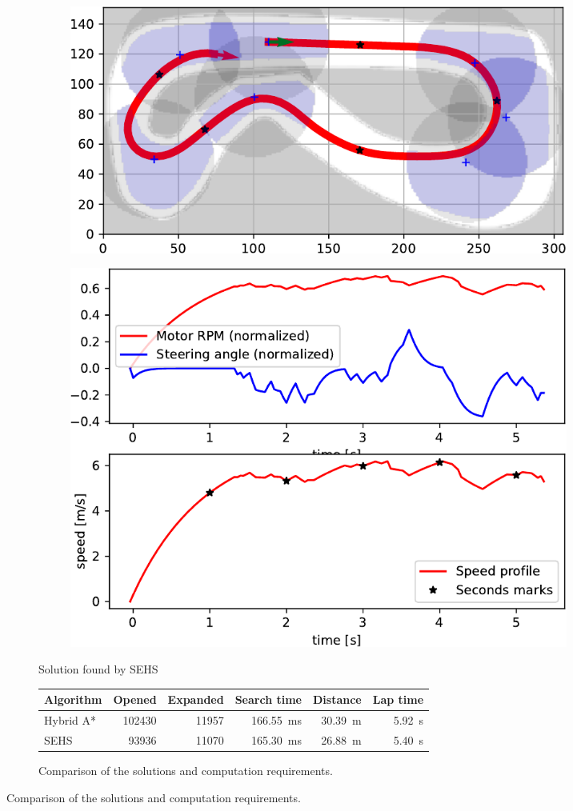 \begin{figure}[!tbp]
	\begin{subfigure}[t]{\textwidth}
		\begin{subfigure}[t]{0.45\textwidth}
			\includegraphics[width=\textwidth]{../img/experiments/porto-sehs-trajectory}
		\end{subfigure}
		\hfill
		\begin{subfigure}[t]{0.45\textwidth}
			\includegraphics[width=\textwidth]{../img/experiments/porto-sehs-actuators}
		\end{subfigure}
		\caption{Solution found by SEHS}
		\label{fig:solution_porto-sehs}
	\end{subfigure}

	\vspace{0.75cm}
	
	\begin{subfigure}[t]{\textwidth}
		\centering
		\begin{tabular}{l r r r r r}%
			\toprule
			Algorithm & Opened & Expanded & Search time & Distance & Lap time \\
			\midrule
			Hybrid A* & \num{102430} & \num{11957} & \SI{166.55}{\milli\second} & \SI{30.39}{\meter} & \SI{5.92}{\second} \\
			SEHS & \bftab \num{93936} & \bftab \num{11070} & \bftab \SI{165.30}{\milli\second} & \bftab \SI{26.88}{\meter} & \bftab \SI{5.40}{\second} \\
			\bottomrule
		\end{tabular}
		\caption{Comparison of the solutions and computation requirements.}
		\label{table:porto}
	\end{subfigure}


\end{figure}
